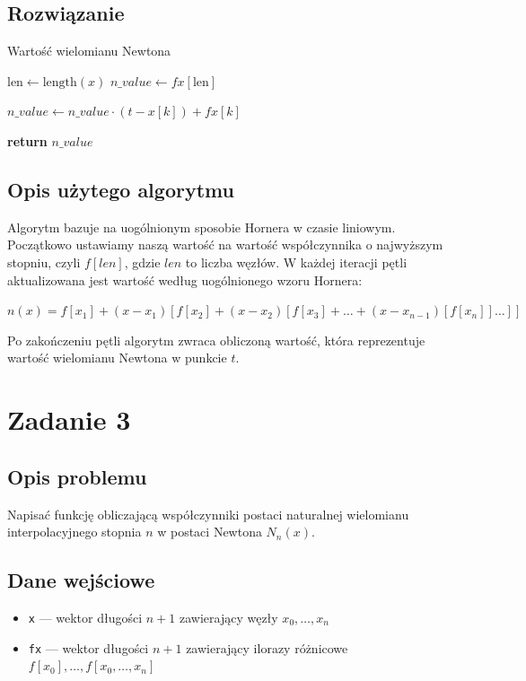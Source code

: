 \documentclass{article}
\begin{document}
\subsection*{Rozwiązanie}
	\begin{algorithm}
	\caption{Wartość wielomianu Newtona}
	\begin{algorithmic}[1]
	        \State $\text{len} \gets \text{length}(x)$
	        \State $n\_value \gets fx[\text{len}]$
	        
	            \State $n\_value \gets n\_value \cdot (t - x[k]) + fx[k]$
	        \EndFor
	        
	        \State \textbf{return} $n\_value$
	    \EndFunction
	\end{algorithmic}
	\end{algorithm}
\subsection*{Opis użytego algorytmu}
	Algorytm bazuje na uogólnionym sposobie Hornera w czasie liniowym. Początkowo ustawiamy naszą wartość na wartość współczynnika o najwyższym stopniu, czyli $f[len]$, gdzie $len$ to liczba węzłów. W każdej iteracji pętli aktualizowana jest wartość według uogólnionego wzoru Hornera:
\centerline{$n(x) = f[x_1] + (x - x_1) \left[f[x_2] + (x - x_2) \left[f[x_3] + \ldots + (x - x_{n-1}) \left[f[x_n]\right]\ldots\right]\right]$}
	Po zakończeniu pętli algorytm zwraca obliczoną wartość, która reprezentuje wartość wielomianu Newtona w punkcie $t$.

\clearpage

\section*{Zadanie 3}
\subsection*{Opis problemu}
	Napisać funkcję obliczającą współczynniki postaci naturalnej wielomianu interpolacyjnego stopnia $n$ w postaci Newtona $N_n(x)$.
\subsection*{Dane wejściowe}
	\begin{itemize}
	    \item \texttt{x} — wektor długości $n+1$ zawierający węzły $x_0,\dots,x_n$
	    \item \texttt{fx} — wektor długości $n+1$ zawierający ilorazy różnicowe $f[x_0], \dots, f[x_0,\dots,x_n]$
	\end{itemize}
\end{document}

